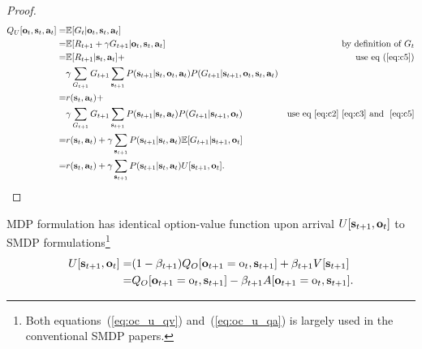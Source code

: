 \begin{proof}
\begin{align*}
  Q_U[{\mathbf{o}}_t, {\mathbf{s}}_t,{\mathbf{a}}_t] = &\mathbb{E}[G_t|{\mathbf{o}}_t, {\mathbf{s}}_t,{\mathbf{a}}_t] &\text{\;} \\
  = &\mathbb{E}[R_{t+1}+\gamma G_{t+1}|{\mathbf{o}}_t, {\mathbf{s}}_t,{\mathbf{a}}_t] & \text{by definition of $G_t$}\\
  =&\mathbb{E}[R_{t+1}|{\mathbf{s}}_t,{\mathbf{a}}_t] +&\text{use eq~(\ref{eq:c5})} \\
                               &\gamma\sum_{G_{t+1}}G_{t+1}\sum_{{\mathbf{s}}_{t+1}}P({\mathbf{s}}_{t+1}|{\mathbf{s}}_t,{\mathbf{o}}_t,{\mathbf{a}}_t)P(G_{t+1}|{\mathbf{s}}_{t+1},{\mathbf{o}}_t,{\mathbf{s}}_t,{\mathbf{a}}_t)\\
  =&r({\mathbf{s}}_t,{\mathbf{a}}_t)+\\
                               &\gamma\sum_{G_{t+1}}G_{t+1}\sum_{{\mathbf{s}}_{t+1}}P({\mathbf{s}}_{t+1}|{\mathbf{s}}_t,{\mathbf{a}}_t)P(G_{t+1}|{\mathbf{s}}_{t+1},{\mathbf{o}}_t) &\text{use eq~\ref{eq:c2}~\ref{eq:c3} and ~\ref{eq:c5}}\\
  =&r({\mathbf{s}}_t,{\mathbf{a}}_t)+\gamma\sum_{{\mathbf{s}}_{t+1}}P({\mathbf{s}}_{t+1}|{\mathbf{s}}_t,{\mathbf{a}}_t)\mathbb{E}[ G_{t+1}|{\mathbf{s}}_{t+1},{\mathbf{o}}_t ]\\
  =&r({\mathbf{s}}_t,{\mathbf{a}}_t)+\gamma\sum_{{\mathbf{s}}_{t+1}}P({\mathbf{s}}_{t+1}|{\mathbf{s}}_t,{\mathbf{a}}_t)U[{\mathbf{s}}_{t+1},{\mathbf{o}}_t].
\end{align*}
\end{proof}


\begin{prop}
  \label{prop:oc_u}
  MDP formulation has identical option-value function upon
  arrival $U[{\mathbf{s}}_{t+1},{\mathbf{o}}_t]$ to SMDP
  formulations\footnote{Both equations~(\ref{eq:oc_u_qv})
    and~(\ref{eq:oc_u_qa}) is largely used in the conventional
    SMDP papers\cite{sutton1999between,bacon2017option}.}
 \begin{align}
\label{eq:oc_u_qv}  U[{\mathbf{s}}_{t+1},{\mathbf{o}}_t]= &(1-\beta_{t+1})Q_O[{\mathbf{o}}_{t+1}={\textnormal{o}}_t,{\mathbf{s}}_{t+1}] +\beta_{t+1}V[{\mathbf{s}}_{t+1}]\\
 \label{eq:oc_u_qa} = &Q_O[{\mathbf{o}}_{t+1}={\textnormal{o}}_t,{\mathbf{s}}_{t+1}] -\beta_{t+1}A[{\mathbf{o}}_{t+1}={\textnormal{o}}_t,{\mathbf{s}}_{t+1}].
\end{align}
\end{prop}


